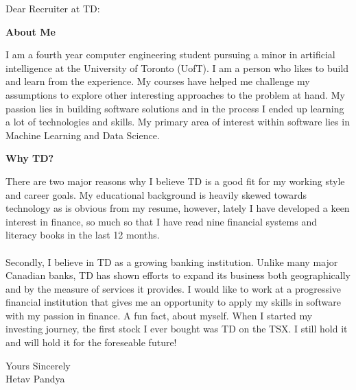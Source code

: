 \documentclass[a4paper,english]{friggeri-letter}
\begin{document}

\address{
   85 Wood St \\
   Toronto, ON, Canada
}





\opening{Dear Recruiter at TD:}

\textbf{About Me}

I am a fourth year computer engineering student pursuing a minor in artificial intelligence at the University of Toronto (UofT). I am a person who likes to build and learn from the experience. My courses have helped me challenge my assumptions to explore other interesting approaches to the problem at hand. My passion lies in building software solutions and in the process I ended up learning a lot of technologies and skills. My primary area of interest within software lies in Machine Learning and Data Science.



\textbf{Why TD?}

There are two major reasons why I believe TD is a good fit for my working style and career goals. My educational background is heavily skewed towards technology as is obvious from my resume, however, lately I have developed a keen interest in finance, so much so that I have read nine financial systems and literacy books in the last 12 months. \\
\\Secondly, I believe in TD as a growing banking institution. Unlike many major Canadian banks, TD has shown efforts to expand its business both geographically and by the measure of services it provides.
I would like to work at a progressive financial institution that gives me an opportunity to apply my skills in software with my passion in finance. A fun fact, about myself. When I started my investing journey, the first stock I ever bought was TD on the TSX.
I still hold it and will hold it for the foreseable future!


\vspace*{0.1cm}
\closing{
   Yours Sincerely\\
   Hetav Pandya}
\end{document}
